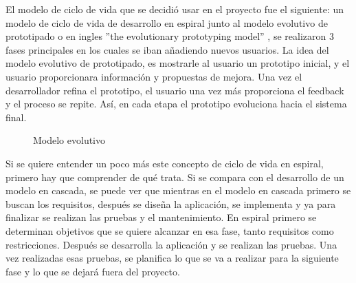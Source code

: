 El modelo de ciclo de vida que se decidió usar en el proyecto fue el siguiente: un modelo de ciclo de vida de desarrollo en espiral\cite{Espiral}\cite{EspiralBoehm} junto al modelo evolutivo de prototipado o en ingles ''the evolutionary prototyping model'' , se realizaron 3 fases principales en los cuales se iban añadiendo nuevos usuarios.
La idea del modelo evolutivo de prototipado, es mostrarle al usuario un prototipo inicial, y el usuario proporcionara información y propuestas de mejora. Una vez el desarrollador refina el prototipo, el usuario una vez más proporciona el feedback y el proceso se repite. Así, en cada etapa el prototipo evoluciona hacia el sistema final.
\begin{figure}[H] 
  \begin{center} 
    \caption{Modelo evolutivo\cite{Modeloevolutivo}} 
    \label{fig:Espiral} 
  \end{center} 
\end{figure}
Si se quiere entender un poco más este concepto de ciclo de vida en espiral, primero hay que comprender de qué trata. Si se compara con el desarrollo de un modelo en cascada, se puede ver que mientras en el modelo en cascada primero se buscan los requisitos, después se diseña la aplicación, se implementa y ya para finalizar se realizan las pruebas y el mantenimiento. 
En espiral primero se determinan objetivos que se quiere alcanzar en esa fase, tanto requisitos como restricciones. Después se desarrolla la aplicación y se realizan las pruebas. Una vez realizadas esas pruebas, se planifica lo que se va a realizar para la siguiente fase y lo que se dejará fuera del proyecto. 

